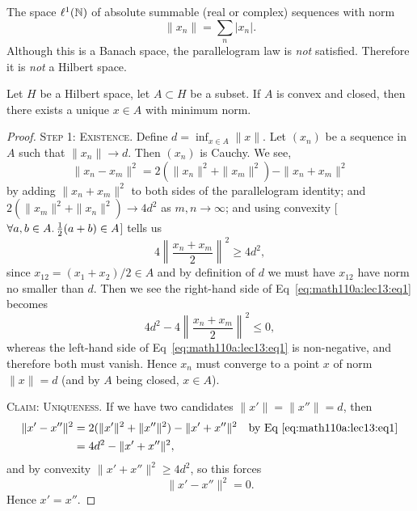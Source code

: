 \begin{non-example}
The space $\ell^{1}(\mathbb{N})$ of absolute summable (real or complex)
sequences with norm
\begin{equation}
\|x_{n}\|=\sum_{n}|x_{n}|.
\end{equation}
Although this is a Banach space, the parallelogram law is \emph{not}
satisfied. Therefore it is \emph{not} a Hilbert space.
\end{non-example}

\begin{lemma}[Riesz]
Let $H$ be a Hilbert space, let $A\subset H$ be a subset.
If $A$ is convex and closed, then there exists a unique $x\in A$ with
minimum norm.
\end{lemma}

\begin{proof}
\textsc{Step 1: Existence}. Define $d=\inf_{x\in A}\|x\|$. Let
$(x_{n})$ be a sequence in $A$ such that $\|x_{n}\|\to d$. Then
$(x_{n})$ is Cauchy. We see,
\begin{equation}\label{eq:math110a:lec13:eq1}
\|x_{n}-x_{m}\|^{2}=2(\|x_{n}\|^{2}+\|x_{m}\|^{2})-\|x_{n}+x_{m}\|^{2}
\end{equation}
by adding $\|x_{n}+x_{m}\|^{2}$ to both sides of the parallelogram
identity; and $2(\|x_{m}\|^{2}+\|x_{n}\|^{2})\to4d^{2}$ as $m,n\to\infty$;
and using convexity [$\forall a,b\in A\ldotp\frac{1}{2}(a+b)\in A$]
tells us
\begin{equation}
4\left\|\frac{x_{n}+x_{m}}{2}\right\|^{2}\geq4d^{2},
\end{equation}
since $x_{12}=(x_{1}+x_{2})/2\in A$ and by definition of $d$ we must
have $x_{12}$ have norm no smaller than $d$. Then we see the
right-hand side of Eq~\eqref{eq:math110a:lec13:eq1} becomes
\begin{equation}
4d^{2}-4\left\|\frac{x_{n}+x_{m}}{2}\right\|^{2}\leq0,
\end{equation}
whereas the left-hand side of Eq~\eqref{eq:math110a:lec13:eq1} is non-negative,
and therefore both must vanish. Hence $x_{n}$ must converge to a point
$x$ of norm $\|x\|=d$ (and by $A$ being closed, $x\in A$).

\textsc{Claim: Uniqueness}. If we have two candidates $\|x'\|=\|x''\|=d$,
then
\begin{subequations}
  \begin{align}
\|x'-x''\|^{2} &=
2(\|x'\|^{2}+\|x''\|^{2})-\|x'+x''\|^{2}\quad\mbox{by Eq~\eqref{eq:math110a:lec13:eq1}}\\
&=4d^{2}-\|x'+x''\|^{2},
  \end{align}
\end{subequations}
and by convexity $\|x'+x''\|^{2}\geq4d^{2}$, so this forces
\begin{equation}
\|x'-x''\|^{2}=0.
\end{equation}
Hence $x'=x''$.
\end{proof}

